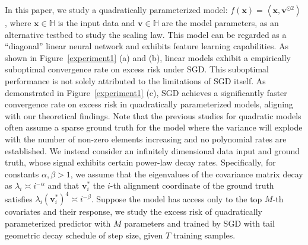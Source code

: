 In this paper, we study a quadratically parameterized model:  $f\left (  \mathbf{x} \right ) = \left \langle  \mathbf{x}, \mathbf{v}^{\odot 2} \right \rangle $, where $\mathbf{x}\in \mathbb{H}$ is the input data and 
$\mathbf{v}\in \mathbb{H}$ are the model parameters, 
as an alternative testbed to study the scaling law.  This model can be regarded as a ``diagonal'' linear neural network and exhibits feature learning capabilities. As shown in Figure~\ref{experiment1} (a) and (b), linear models exhibit a empirically suboptimal convergence rate on excess risk under SGD. This suboptimal performance is not solely attributed to the limitations of SGD itself. As demonstrated in Figure~\ref{experiment1} (c), SGD achieves a significantly faster convergence rate on excess risk in quadratically parameterized models, aligning with our theoretical findings. Note that the previous studies for quadratic models  \citep{haochen21shape} often assume a sparse ground
truth for the model where the variance will explode with the number of non-zero elements increasing and no polynomial rates are established. We instead consider an infinitely dimensional data input and ground
truth, whose signal exhibits certain power-law
decay rates.  Specifically,  for constants $\alpha,\beta>1$, we assume that the eigenvalues of the covariance matrix decay as $\lambda_i\asymp i^{-\alpha}$ and that $\mathbf{v}^*_i$ the $i$-th alignment coordinate of the ground truth satisfies $\lambda_i\left(\mathbf{v}^*_i\right)^4\asymp i^{-\beta}$.
Suppose the model has access only to the top $M$-th covariates and their response, we study the excess risk of quadratically parameterized predictor with $M$ parameters and trained by SGD with tail geometric decay schedule of step size, given $T$ training samples. %



